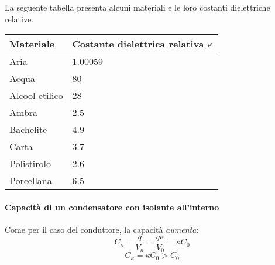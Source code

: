 La seguente tabella presenta alcuni materiali e le loro costanti dielettriche relative.
\begin{center}
	\begin{tabular}{ll}
		\textbf{Materiale}      & \textbf{Costante dielettrica relativa} $\kappa$\\\hline
		Aria           & \num{1,00059}                                                                    \\
		Acqua          & \num{80}                                                                         \\
		Alcool etilico & \num{28}                                                                         \\
		Ambra          & \num{2,5}                                                                        \\
		Bachelite      & \num{4,9}                                                                        \\
		Carta          & \num{3,7}                                                                        \\
		Polistirolo    & \num{2,6}                                                                        \\
		Porcellana     & \num{6,5}                                                                       
	\end{tabular}
\end{center}
\paragraph{Capacità di un condensatore con isolante all'interno}
Come per il caso del conduttore, la capacità \textit{aumenta}:
\begin{equation*}
	C_{\kappa}=\frac{q}{V_{\kappa}}=\frac{q\kappa}{V_0}=\kappa C_0
\end{equation*}
\begin{equation}
	C_{\kappa}=\kappa C_0>C_0
\end{equation}

